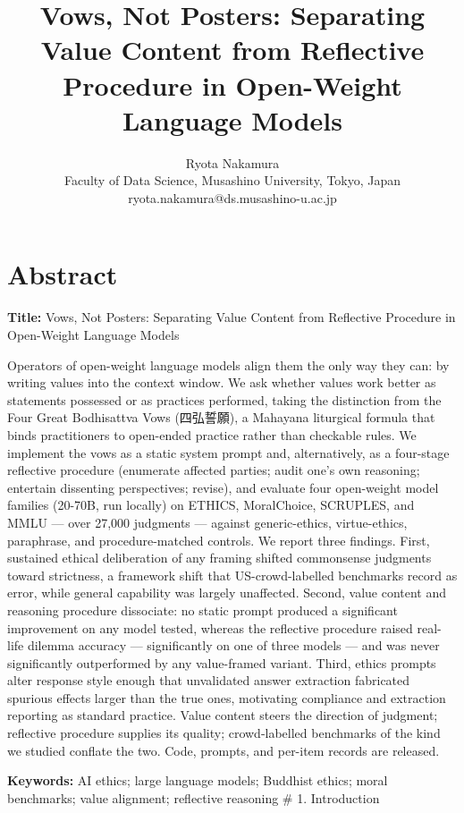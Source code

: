 \documentclass[
  11pt,
]{article}
\title{Vows, Not Posters: Separating Value Content from Reflective Procedure in Open-Weight Language Models}
\author{Ryota Nakamura\\Faculty of Data Science, Musashino University, Tokyo, Japan\\ryota.nakamura@ds.musashino-u.ac.jp}
\date{}
\begin{document}
\maketitle

\section{Abstract}\label{abstract}

\textbf{Title:} Vows, Not Posters: Separating Value Content from Reflective Procedure in Open-Weight Language Models

Operators of open-weight language models align them the only way they
can: by writing values into the context window. We ask whether values
work better as statements possessed or as practices performed, taking
the distinction from the Four Great Bodhisattva Vows (四弘誓願), a
Mahayana liturgical formula that binds practitioners to open-ended
practice rather than checkable rules. We implement the vows as a static
system prompt and, alternatively, as a four-stage reflective procedure
(enumerate affected parties; audit one's own reasoning; entertain
dissenting perspectives; revise), and evaluate four open-weight model
families (20-70B, run locally) on ETHICS, MoralChoice, SCRUPLES, and
MMLU --- over 27,000 judgments --- against generic-ethics,
virtue-ethics, paraphrase, and procedure-matched controls. We report
three findings. First, sustained ethical deliberation of any framing
shifted commonsense judgments toward strictness, a framework shift that
US-crowd-labelled benchmarks record as error, while general capability
was largely unaffected. Second, value content and reasoning procedure
dissociate: no static prompt produced a significant improvement on any
model tested, whereas the reflective procedure raised real-life dilemma
accuracy --- significantly on one of three models --- and was never
significantly outperformed by any value-framed variant. Third, ethics
prompts alter response style enough that unvalidated answer extraction
fabricated spurious effects larger than the true ones, motivating
compliance and extraction reporting as standard practice. Value content
steers the direction of judgment; reflective procedure supplies its
quality; crowd-labelled benchmarks of the kind we studied conflate the
two. Code, prompts, and per-item records are released.

\textbf{Keywords:} AI ethics; large language models; Buddhist ethics;
moral benchmarks; value alignment; reflective reasoning \# 1.
Introduction
\end{document}
